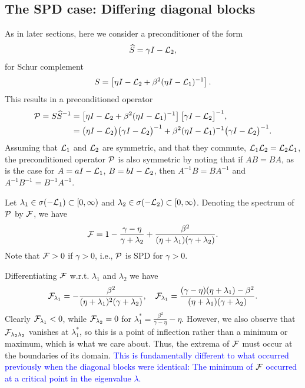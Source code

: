 \documentclass[a4paper,10pt]{article}
\newcommand{\tcb}{\textcolor{blue}}
\begin{document}
{\subsection{The SPD case: Differing diagonal blocks}

As in later sections, here we consider a preconditioner of the form
\begin{align}
\widehat{S} = \gamma I -  {\cal L}_2,
\end{align}
for Schur complement
\begin{align}
S
= 
\left[ \eta I - {\cal L}_2 + \beta^2(\eta I - {\cal L}_1)^{-1} \right].
\end{align}
This results in a preconditioned operator
\begin{align}
{\cal P}
= 
S \widehat{S}^{-1} 
&= 
\left[ \eta I - {\cal L}_2 + \beta^2(\eta I - {\cal L}_1)^{-1} \right] 
\big[ \gamma I -  {\cal L}_2 \big]^{-1}, \\
&=
\big( \eta I - {\cal L}_2 \big) \big( \gamma I -  {\cal L}_2 \big)^{-1}  + \beta^2(\eta I - {\cal L}_1)^{-1} \big( \gamma I -  {\cal L}_2 \big)^{-1}.
\end{align}
Assuming that ${\cal L}_1$ and ${\cal L}_2$ are symmetric, and that they commute, ${\cal L}_1 {\cal L}_2 = {\cal L}_2 {\cal L}_1$, the preconditioned operator ${\cal P}$ is also symmetric by noting that if $AB = BA$, as is the case for $A = a I - {\cal L}_1$, $B = b I - {\cal L}_2$, then $A^{-1} B = B  A^{-1}$ and $A^{-1} B^{-1} = B^{-1} A^{-1}$.

Let $\lambda_1 \in \sigma(- {\cal L}_1) \subset [0,\infty)$ and $\lambda_2 \in \sigma(- {\cal L}_2) \subset [0,\infty)$. Denoting the spectrum of ${\cal P}$ by ${\cal F}$, we have
\begin{align}
{\cal F} 
= 
1 - 
\frac{\gamma - \eta}{\gamma + \lambda_2}
+
\frac{\beta^2}{(\eta + \lambda_1)(\gamma + \lambda_2)}.
\end{align}
Note that ${\cal F} > 0$ if $\gamma > 0$, i.e., ${\cal P}$ is SPD for $\gamma > 0$.

Differentiating ${\cal F}$ w.r.t. $\lambda_1$ and $\lambda_2$ we have
\begin{align}
{\cal F}_{\lambda_1} = -  \frac{\beta^2}{(\eta + \lambda_1)^2(\gamma + \lambda_2)}, 
\quad
{\cal F}_{\lambda_1} =  \frac{(\gamma-\eta)(\eta + \lambda_1) - \beta^2}{(\eta + \lambda_1)(\gamma + \lambda_2)}.
\end{align}
Clearly ${\cal F}_{\lambda_1} < 0$, while ${\cal F}_{\lambda_2} = 0$ for $\lambda_1^* = \frac{\beta^2}{\gamma - \eta} - \eta$. However, we also observe that ${\cal F}_{\lambda_2 \lambda_2}$ vanishes at  $\lambda_1^*$, so this is a point of inflection rather than a minimum or maximum, which is what we care  about. Thus, the extrema of ${\cal F}$ must occur at the boundaries of its domain. \tcb{This is fundamentally different to what occurred previously when the diagonal blocks were identical: The minimum of ${\cal F}$ occurred at a critical point in the eigenvalue $\lambda$.}

}
\end{document}
